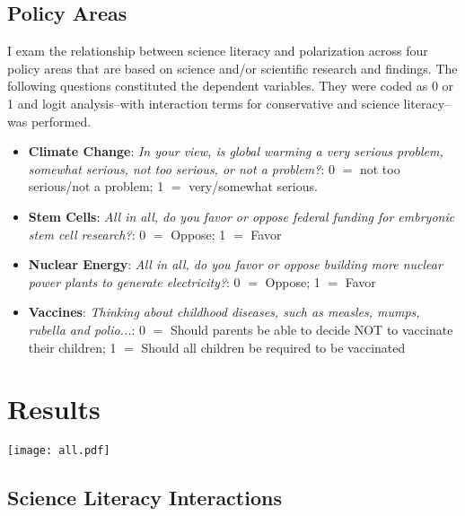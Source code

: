 \documentclass[a0,final]{a0poster}
\begin{document}
\begin{multicols}{3}
\columnbreak

\subsection*{Policy Areas}

I exam the relationship between science literacy and polarization across four policy areas that are based on science and/or scientific research and findings. The following questions constituted the dependent variables. They were coded as 0 or 1 and logit analysis--with interaction terms for conservative and science literacy--was performed. 

\begin{itemize}
\item \textbf{Climate Change}: \textit{In your view, is global warming a very serious problem, somewhat serious, not too serious, or not a problem?}: 0 $=$ not too serious/not a problem; 1 $=$ very/somewhat serious.  
\item \textbf{Stem Cells}: \textit{All in all, do you favor or oppose federal funding for embryonic stem cell research?}: 0 $=$ Oppose; 1 $=$ Favor
\item \textbf{Nuclear Energy}: \textit{All in all, do you favor or oppose building more nuclear power plants to generate electricity?}: 0 $=$ Oppose; 1 $=$ Favor 
\item \textbf{Vaccines}: \textit{Thinking about childhood diseases, such as measles, mumps, rubella and polio...}: 0 $=$ Should parents be able to decide NOT to vaccinate their children; 1 $=$ Should all children be required to be vaccinated 
\end{itemize}

\section*{Results}

\texttt{[image: all.pdf]}

\subsection*{Science Literacy Interactions}


\end{multicols}
\end{document}

